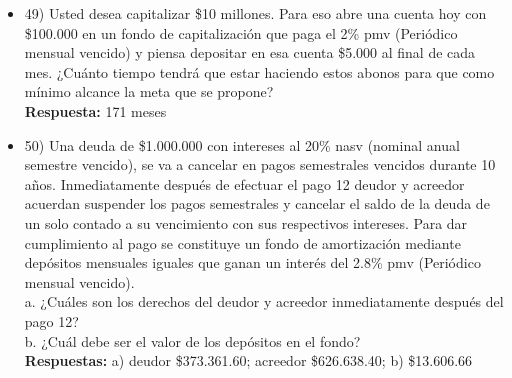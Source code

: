 \begin{itemize}
	\item 49) Usted desea capitalizar \$10 millones. Para eso abre una cuenta hoy con \$100.000 en un fondo de capitalización que paga el 2\% pmv (Periódico mensual vencido) y piensa depositar en esa cuenta \$5.000 al final de cada mes. ¿Cuánto tiempo tendrá que estar haciendo estos abonos para que como mínimo alcance la meta que se propone? \\
	\textbf{Respuesta: }171 meses
	\medskip
	
	\item 50) Una deuda de \$1.000.000 con intereses al 20\% nasv (nominal anual semestre vencido), se va a cancelar en pagos semestrales vencidos durante 10 años. Inmediatamente después de efectuar el pago 12 deudor y acreedor acuerdan suspender los pagos semestrales y cancelar el saldo de la deuda de un solo contado a su vencimiento con sus respectivos intereses. Para dar cumplimiento al pago se constituye un fondo de amortización mediante depósitos mensuales iguales que ganan un interés del 2.8\% pmv (Periódico mensual vencido). \\
	
	a.	¿Cuáles son los derechos del deudor y acreedor inmediatamente después del pago 12? \\
	b.	¿Cuál debe ser el valor de los depósitos en el fondo?\\
	\textbf{Respuestas:} a) deudor \$373.361.60; acreedor \$626.638.40; b) \$13.606.66
	
\end{itemize}